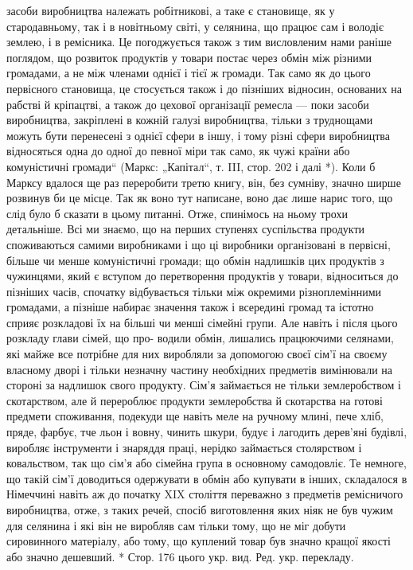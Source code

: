 \parcont{}  %
засоби виробництва належать робітникові, а таке є становище, як у стародавньому, так і в новітньому світі, у селянина, що працює сам і володіє землею, і в ремісника. Це погоджується також з тим висловленим нами раніше поглядом, що розвиток
продуктів у товари постає через обмін між різними громадами, а не між членами однієї і тієї ж громади. Так само як до цього
первісного становища, це стосується також і до пізніших відносин, основаних на рабстві й кріпацтві, а також до цехової
організації ремесла — поки засоби виробництва, закріплені в кожній галузі виробництва, тільки з труднощами можуть бути
перенесені з однієї сфери в іншу, і тому різні сфери виробництва відносяться одна до одної до певної міри так само, як чужі
країни або комуністичні громади“ (Маркс: „Капітал“,  т. III, стор. 202 і далі *).
Коли б Марксу вдалося ще раз переробити третю книгу, він, без сумніву, значно ширше розвинув би це місце. Так як воно тут
написане, воно дає лише нарис того, що слід було б сказати в цьому питанні. Отже, спинімось на ньому трохи детальніше. Всі
ми знаємо, що на перших ступенях суспільства продукти споживаються самими виробниками і що ці виробники організовані в
первісні, більше чи менше комуністичні громади; що обмін надлишків цих продуктів з чужинцями, який є вступом до перетворення
продуктів у товари, відноситься до пізніших часів, спочатку відбувається тільки між окремими різноплемінними громадами, а
пізніше набирає значення також і всередині громад та істотно сприяє розкладові їх на більші чи менші сімейні групи. Але
навіть і після цього розкладу глави сімей, що про- водили обмін, лишались працюючими селянами, які майже все потрібне для
них виробляли за допомогою своєї сім’ї на своєму власному дворі і тільки незначну частину необхідних предметів вимінювали на
стороні за надлишок свого продукту. Сім’я займається не тільки землеробством і скотарством, але й перероблює продукти
землеробства й скотарства на готові предмети споживання, подекуди ще навіть меле на ручному млині, пече хліб, пряде, фарбує,
тче льон і вовну, чинить шкури, будує і лагодить дерев’яні будівлі, виробляє інструменти і знаряддя праці, нерідко
займається столярством і ковальством, так що сім’я або сімейна група в основному самодовліє. Те немноге, що такій сім’ї
доводиться одержувати в обмін або купувати в інших, складалося в Німеччині навіть аж до початку XIX століття переважно з
предметів ремісничого виробництва, отже, з таких речей, спосіб виготовлення яких ніяк не був чужим для селянина і які він не
виробляв сам тільки тому, що не міг добути сировинного матеріалу, або тому, що куплений товар був значно кращої якості або
значно дешевший.
* Стор. 176 цього укр. вид. Ред. укр. перекладу.
